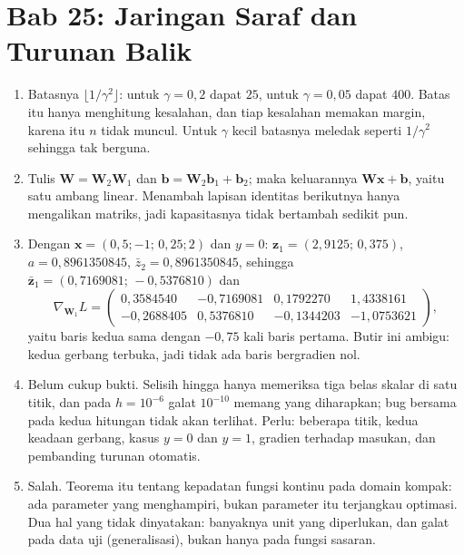 \section*{Bab 25: Jaringan Saraf dan Turunan Balik}
\begin{enumerate}[label=\textbf{25.\arabic*}]
  \item Batasnya $\lfloor1/\gamma^{2}\rfloor$: untuk $\gamma=0{,}2$ dapat $25$,
        untuk $\gamma=0{,}05$ dapat $400$. Batas itu hanya menghitung kesalahan,
        dan tiap kesalahan memakan margin, karena itu $n$ tidak muncul. Untuk
        $\gamma$ kecil batasnya meledak seperti $1/\gamma^{2}$ sehingga tak berguna.

  \item Tulis $\mathbf{W}=\mathbf{W}_{2}\mathbf{W}_{1}$ dan
        $\mathbf{b}=\mathbf{W}_{2}\mathbf{b}_{1}+\mathbf{b}_{2}$; maka keluarannya
        $\mathbf{W}\mathbf{x}+\mathbf{b}$, yaitu satu ambang linear. Menambah lapisan
        identitas berikutnya hanya mengalikan matriks, jadi kapasitasnya tidak
        bertambah sedikit pun.

  \item Dengan $\mathbf{x}=(0{,}5;-1;\,0{,}25;2)$ dan $y=0$: $\mathbf{z}_{1}=(2{,}9125;\,
        0{,}375)$, $a=0{,}8961350845$, $\bar{z}_{2}=0{,}8961350845$, sehingga
        $\bar{\mathbf{z}}_{1}=(0{,}7169081;\,-0{,}5376810)$ dan
        \[
          \nabla_{\mathbf{W}_{1}}L=
          \begin{pmatrix}
            0{,}3584540 & -0{,}7169081 & 0{,}1792270 & 1{,}4338161\\
            -0{,}2688405 & 0{,}5376810 & -0{,}1344203 & -1{,}0753621
          \end{pmatrix},
        \]
        yaitu baris kedua sama dengan $-0{,}75$ kali baris pertama. Butir ini
        ambigu: kedua gerbang terbuka, jadi tidak ada baris bergradien nol.

  \item Belum cukup bukti. Selisih hingga hanya memeriksa tiga belas skalar di satu
        titik, dan pada $h=10^{-6}$ galat $10^{-10}$ memang yang diharapkan; bug
        bersama pada kedua hitungan tidak akan terlihat. Perlu: beberapa titik,
        kedua keadaan gerbang, kasus $y=0$ dan $y=1$, gradien terhadap masukan, dan
        pembanding turunan otomatis.

  \item Salah. Teorema itu tentang kepadatan fungsi kontinu pada domain
        kompak: ada parameter yang menghampiri, bukan parameter itu terjangkau
        optimasi. Dua hal yang tidak dinyatakan: banyaknya unit yang diperlukan, dan
        galat pada data uji (generalisasi), bukan hanya pada fungsi sasaran.


\end{enumerate}
